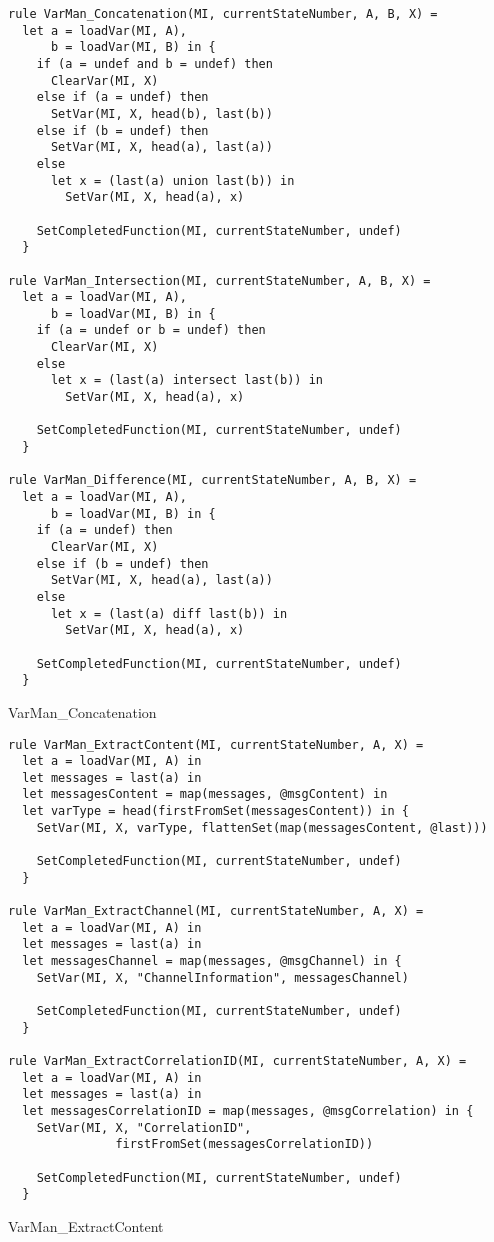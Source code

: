 \begin{listing}[H]
\begin{verbatim}
rule VarMan_Concatenation(MI, currentStateNumber, A, B, X) =
  let a = loadVar(MI, A),
      b = loadVar(MI, B) in {
    if (a = undef and b = undef) then
      ClearVar(MI, X)
    else if (a = undef) then
      SetVar(MI, X, head(b), last(b))
    else if (b = undef) then
      SetVar(MI, X, head(a), last(a))
    else
      let x = (last(a) union last(b)) in
        SetVar(MI, X, head(a), x)

    SetCompletedFunction(MI, currentStateNumber, undef)
  }

rule VarMan_Intersection(MI, currentStateNumber, A, B, X) =
  let a = loadVar(MI, A),
      b = loadVar(MI, B) in {
    if (a = undef or b = undef) then
      ClearVar(MI, X)
    else
      let x = (last(a) intersect last(b)) in
        SetVar(MI, X, head(a), x)

    SetCompletedFunction(MI, currentStateNumber, undef)
  }

rule VarMan_Difference(MI, currentStateNumber, A, B, X) =
  let a = loadVar(MI, A),
      b = loadVar(MI, B) in {
    if (a = undef) then
      ClearVar(MI, X)
    else if (b = undef) then
      SetVar(MI, X, head(a), last(a))
    else
      let x = (last(a) diff last(b)) in
        SetVar(MI, X, head(a), x)

    SetCompletedFunction(MI, currentStateNumber, undef)
  }
\end{verbatim}
\caption{VarMan\_Concatenation}
\label{lst:asm:VarMan_Concatenation}
\end{listing}




\begin{listing}[H]
\begin{verbatim}
rule VarMan_ExtractContent(MI, currentStateNumber, A, X) =
  let a = loadVar(MI, A) in
  let messages = last(a) in
  let messagesContent = map(messages, @msgContent) in
  let varType = head(firstFromSet(messagesContent)) in {
    SetVar(MI, X, varType, flattenSet(map(messagesContent, @last)))

    SetCompletedFunction(MI, currentStateNumber, undef)
  }

rule VarMan_ExtractChannel(MI, currentStateNumber, A, X) =
  let a = loadVar(MI, A) in
  let messages = last(a) in
  let messagesChannel = map(messages, @msgChannel) in {
    SetVar(MI, X, "ChannelInformation", messagesChannel)

    SetCompletedFunction(MI, currentStateNumber, undef)
  }

rule VarMan_ExtractCorrelationID(MI, currentStateNumber, A, X) =
  let a = loadVar(MI, A) in
  let messages = last(a) in
  let messagesCorrelationID = map(messages, @msgCorrelation) in {
    SetVar(MI, X, "CorrelationID",
               firstFromSet(messagesCorrelationID))

    SetCompletedFunction(MI, currentStateNumber, undef)
  }
\end{verbatim}
\caption{VarMan\_ExtractContent}
\label{lst:asm:VarMan_ExtractContent}
\end{listing}





